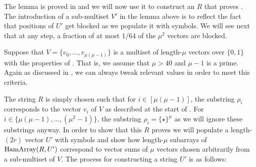\documentclass{toc}
\newcommand{\Hamarray}{\ensuremath{\textup{HamArray}}}
\newcommand{\ps}{\ensuremath{\rho}}
\newcommand{\psymb}{\ensuremath{\star}}
\begin{document}
The lemma is proved in  and we will now use it to construct an $R$ that proves . The introduction of a sub-multiset $V'$ in the lemma above is to reflect the fact that positions of $U'$ get blocked as we populate it with symbols. We will see next that at any step, a fraction of at most $1/64$ of the $\mu^2$ vectors are blocked.

Suppose that $V=\{v_0,\dots,v_{\mu(\mu-1)}\}$ is a multiset of
%
length-$\mu$  %
vectors over $\{0,1\}$ with the properties of . That is, we assume that $\mu>40$ and $\mu-1$ is a prime. Again as discussed in , we can always tweak relevant values in order to meet this criteria.

The string $R$ is simply chosen such that for $i\in[\mu(\mu-1)]$, the substring $\ps_i$ corresponds to the vector $v_i$ of $V$ as described at the start of . For $i\in\{\mu(\mu-1),\dots,(\mu^2-1)\}$, the substring $\ps_i=\{\psymb\}^\mu$ as we will ignore these substrings anyway.
In order to show that this $R$ proves  we will populate a
%
length-$(2r)$  %
vector $U'$ with symbols and show how
%
length-$\mu$  %
subarrays of $\Hamarray(R,U')$ correspond to vector sums of $\mu$ vectors chosen arbitrarily from a sub-multiset of $V$. The process for constructing a string $U'$ is as follows:
\end{document}
